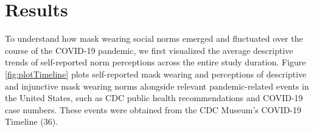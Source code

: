 \documentclass[
  man, donotrepeattitle,floatsintext]{apa6}
\begin{document}
\hypertarget{results}{%
\section{Results}\label{results}}

To understand how mask wearing social norms emerged and fluctuated over the course of the COVID-19 pandemic, we first visualized the average descriptive trends of self-reported norm perceptions across the entire study duration. Figure \ref{fig:plotTimeline} plots self-reported mask wearing and perceptions of descriptive and injunctive mask wearing norms alongside relevant pandemic-related events in the United States, such as CDC public health recommendations and COVID-19 case numbers. These events were obtained from the CDC Museum's COVID-19 Timeline (36).
\end{document}
